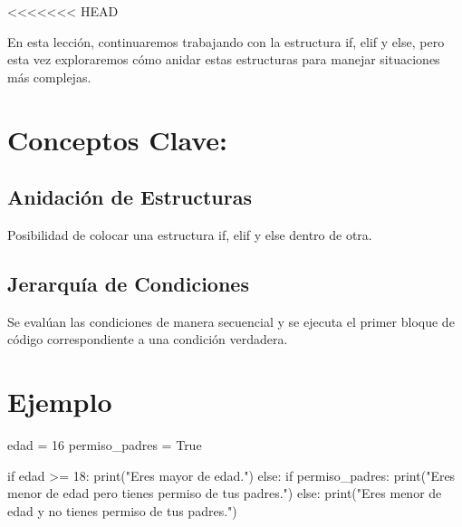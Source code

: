 \documentclass[
  a4paper,
  onepage,
  openany]{scrreprt}
\newenvironment{Shaded}{\begin{snugshade}}{\end{snugshade}}
\newcommand{\BuiltInTok}[1]{\textcolor[rgb]{0.00,0.23,0.31}{#1}}
\newcommand{\ControlFlowTok}[1]{\textcolor[rgb]{0.00,0.23,0.31}{#1}}
\newcommand{\DecValTok}[1]{\textcolor[rgb]{0.68,0.00,0.00}{#1}}
\newcommand{\NormalTok}[1]{\textcolor[rgb]{0.00,0.23,0.31}{#1}}
\newcommand{\OperatorTok}[1]{\textcolor[rgb]{0.37,0.37,0.37}{#1}}
\newcommand{\StringTok}[1]{\textcolor[rgb]{0.13,0.47,0.30}{#1}}
\newcommand{\VariableTok}[1]{\textcolor[rgb]{0.07,0.07,0.07}{#1}}
\begin{document}
\textless\textless\textless\textless\textless\textless\textless{} HEAD

En esta lección, continuaremos trabajando con la estructura if, elif y
else, pero esta vez exploraremos cómo anidar estas estructuras para
manejar situaciones más complejas.

\hypertarget{conceptos-clave-32}{%
\section{Conceptos Clave:}\label{conceptos-clave-32}}

\hypertarget{anidaciuxf3n-de-estructuras}{%
\subsection{Anidación de
Estructuras}\label{anidaciuxf3n-de-estructuras}}

Posibilidad de colocar una estructura if, elif y else dentro de otra.

\hypertarget{jerarquuxeda-de-condiciones}{%
\subsection{Jerarquía de
Condiciones}\label{jerarquuxeda-de-condiciones}}

Se evalúan las condiciones de manera secuencial y se ejecuta el primer
bloque de código correspondiente a una condición verdadera.

\hypertarget{ejemplo-32}{%
\section{Ejemplo}\label{ejemplo-32}}

\begin{Shaded}
\begin{Highlighting}[]
\NormalTok{edad }\OperatorTok{=} \DecValTok{16}
\NormalTok{permiso\_padres }\OperatorTok{=} \VariableTok{True}

\ControlFlowTok{if}\NormalTok{ edad }\OperatorTok{\textgreater{}=} \DecValTok{18}\NormalTok{:}
    \BuiltInTok{print}\NormalTok{(}\StringTok{"Eres mayor de edad."}\NormalTok{)}
\ControlFlowTok{else}\NormalTok{:}
    \ControlFlowTok{if}\NormalTok{ permiso\_padres:}
        \BuiltInTok{print}\NormalTok{(}\StringTok{"Eres menor de edad pero tienes permiso de tus padres."}\NormalTok{)}
    \ControlFlowTok{else}\NormalTok{:}
        \BuiltInTok{print}\NormalTok{(}\StringTok{"Eres menor de edad y no tienes permiso de tus padres."}\NormalTok{)}
\end{Highlighting}
\end{Shaded}
\end{document}
